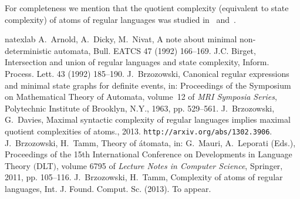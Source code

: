 \documentclass[preprint,12pt]{elsarticle}
\begin{document}
For completeness we mention that the quotient complexity (equivalent to 
state complexity) of atoms of regular languages was studied in~\cite{BrTa13} and~\cite{BrDa13}. 

\begin{thebibliography}{16}
\expandafter\ifx\csname natexlab\endcsname\relax\def\natexlab#1{#1}\fi
\providecommand{\bibinfo}[2]{#2}
\ifx\xfnm\relax \def\xfnm[#1]{\unskip,\space#1}\fi
{}
\bibinfo{author}{A.~Arnold}, \bibinfo{author}{A.~Dicky},
  \bibinfo{author}{M.~Nivat}, \bibinfo{title}{A note about minimal
  non-deterministic automata}, \bibinfo{journal}{Bull. EATCS}
  \bibinfo{volume}{47} (\bibinfo{year}{1992}) \bibinfo{pages}{166--169}.
\bibinfo{author}{J.C. Birget}, \bibinfo{title}{Intersection and union of
  regular languages and state complexity}, \bibinfo{journal}{Inform. Process.
  Lett.} \bibinfo{volume}{43} (\bibinfo{year}{1992}) \bibinfo{pages}{185--190}.
\bibinfo{author}{J.~Brzozowski}, \bibinfo{title}{Canonical regular expressions
  and minimal state graphs for definite events}, in:
  \bibinfo{booktitle}{Proceedings of the Symposium on Mathematical Theory of
  Automata}, volume~\bibinfo{volume}{12} of \textit{\bibinfo{series}{MRI
  Symposia Series}}, \bibinfo{publisher}{Polytechnic Institute of Brooklyn,
  N.Y.}, \bibinfo{year}{1963}, pp. \bibinfo{pages}{529--561}.
\bibinfo{author}{J.~Brzozowski}, \bibinfo{author}{G.~Davies},
  \bibinfo{title}{Maximal syntactic complexity of regular languages implies
  maximal quotient complexities of atoms.}, \bibinfo{year}{2013}.
  \bibinfo{note}{{\tt http://arxiv.org/abs/1302.3906}}.
\bibinfo{author}{J.~Brzozowski}, \bibinfo{author}{H.~Tamm},
  \bibinfo{title}{Theory of \'atomata}, in: \bibinfo{editor}{G.~Mauri},
  \bibinfo{editor}{A.~Leporati} (Eds.), \bibinfo{booktitle}{Proceedings of the
  15th International Conference on Developments in Language Theory
  $($DLT\/$)$}, volume \bibinfo{volume}{6795} of
  \textit{\bibinfo{series}{Lecture Notes in Computer Science}},
  \bibinfo{publisher}{Springer}, \bibinfo{year}{2011}, pp.
  \bibinfo{pages}{105--116}.
\bibinfo{author}{J.~Brzozowski}, \bibinfo{author}{H.~Tamm},
  \bibinfo{title}{Complexity of atoms of regular languages},
  \bibinfo{journal}{Int. J. Found. Comput. Sc.}  (\bibinfo{year}{2013}).
  \bibinfo{note}{To appear}.

\end{thebibliography}
\end{document}
